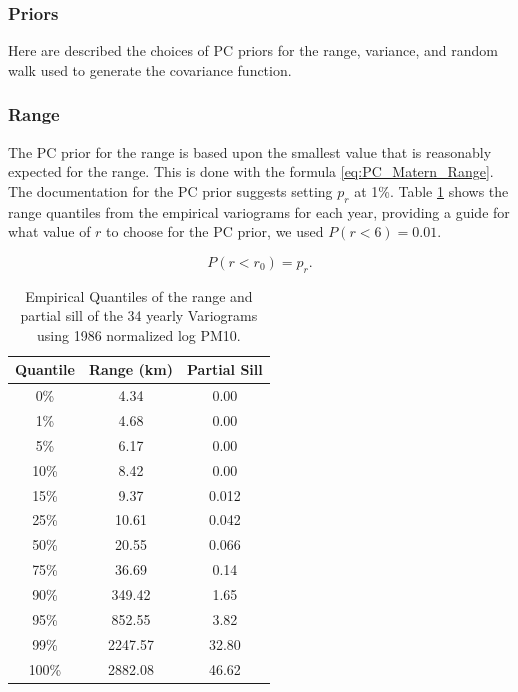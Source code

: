 \documentclass{article}
\begin{document}
\subsubsection*{Priors}
\label{subsubsec:priors}
Here are described the choices of \ac{PC} priors for the range, variance, and random walk used to generate the covariance function.

\subsubsection{Range}
\label{subsubsec:range}
The PC prior for the range is based upon the smallest value that is reasonably expected for the range.  This is done with the formula \ref{eq:PC_Matern_Range}.  The documentation for the PC prior suggests setting $p_r$ at 1\%. Table \ref{tab:Empirical_Range_Sill_Quantile} shows the range quantiles from the empirical variograms for each year, providing a guide for what value of $r$ to choose for the PC prior, we used $P(r < 6) = 0.01$.  

\begin{equation} \label{eq:PC_Matern_Range}
    P(r < r_0) = p_{r}.    
\end{equation} 

\begin{table}[ht]
    \centering
    \begin{tabular}{c||c|c}
        Quantile & Range (km) & Partial Sill \\
        \hline
        0\% & 4.34 & 0.00 \\
        1\% & 4.68 & 0.00 \\
        5\% & 6.17 & 0.00 \\
        10\% & 8.42 & 0.00 \\
        15\% & 9.37 & 0.012 \\
        25\% & 10.61 & 0.042 \\
        50\% & 20.55 & 0.066 \\
        75\% & 36.69 & 0.14 \\
        90\% & 349.42 & 1.65 \\
        95\% & 852.55 & 3.82 \\
        99\% & 2247.57 & 32.80 \\
        100\% & 2882.08 & 46.62 \\
        
    \end{tabular}
    \caption{Empirical Quantiles of the range and partial sill of the 34 yearly Variograms using 1986 normalized log \ac{PM10}. }
    \label{tab:Empirical_Range_Sill_Quantile}
\end{table}
\end{document}
